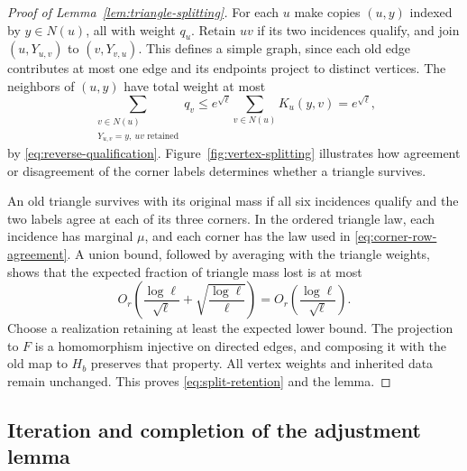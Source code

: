 \begin{proof}[Proof of Lemma~\ref{lem:triangle-splitting}]
For each $u$ make copies $(u,y)$ indexed by $y\in N(u)$, all with
weight $q_u$.  Retain $uv$ if its two incidences qualify, and join
$(u,Y_{u,v})$ to $(v,Y_{v,u})$.  This defines a simple graph, since
each old edge contributes at most one edge and its endpoints project
to distinct vertices.  The neighbors of $(u,y)$ have total weight at
most
\begin{equation}
 \sum_{\substack{v\in N(u)\\
                 Y_{u,v}=y,\ uv\text{ retained}}}q_v
 \le e^{\sqrt\ell}\sum_{v\in N(u)}K_u(y,v)
 =e^{\sqrt\ell},
 \label{eq:split-neighborhood-bound}
\end{equation}
by \eqref{eq:reverse-qualification}.  Figure~\ref{fig:vertex-splitting}
illustrates how agreement or disagreement of the corner labels
determines whether a triangle survives.



An old triangle survives with its original mass if all six incidences
qualify and the two labels agree at each of its three corners.  In the
ordered triangle law, each incidence has marginal $\mu$, and each
corner has the law used in \eqref{eq:corner-row-agreement}.  A union
bound, followed by averaging with the triangle weights, shows that the
expected fraction of triangle mass lost is at most
\[
 O_r\!\left(\frac{\log\ell}{\sqrt\ell}
              +\sqrt{\frac{\log\ell}{\ell}}\right)
       =O_r\!\left(\frac{\log\ell}{\sqrt\ell}\right).
\]
Choose a realization retaining at least the expected lower bound.  The
projection to $F$ is a homomorphism injective on directed edges, and
composing it with the old map to $H_b$ preserves that property.  All
vertex weights and inherited data remain unchanged.  This proves
\eqref{eq:split-retention} and the lemma.
\end{proof}

\subsection{Iteration and completion of the adjustment lemma}
\label{subsec:triangle-iteration}

